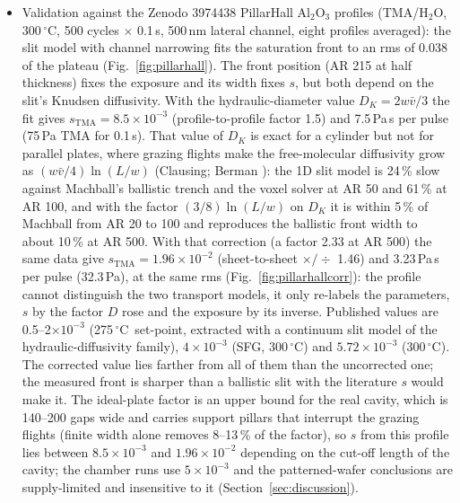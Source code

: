 \documentclass[11pt,letterpaper]{article}
\newcommand{\degC}{$^{\circ}$C}
\begin{document}
\begin{itemize}
\item Validation against the Zenodo 3974438 PillarHall Al$_2$O$_3$ profiles \cite{zenodo3974438,yim2020} (TMA/H$_2$O, 300\,\degC, 500 cycles $\times$ 0.1\,s, 500\,nm lateral channel, eight profiles averaged): the slit model with channel narrowing fits the saturation front to an rms of 0.038 of the plateau (Fig.~\ref{fig:pillarhall}). The front position (AR 215 at half thickness) fixes the exposure and its width fixes $s$, but both depend on the slit's Knudsen diffusivity. With the hydraulic-diameter value $D_K = 2w\bar{v}/3$ the fit gives $s_{\mathrm{TMA}} = 8.5\times10^{-3}$ (profile-to-profile factor 1.5) and 7.5\,Pa\,s per pulse (75\,Pa TMA for 0.1\,s). That value of $D_K$ is exact for a cylinder but not for parallel plates, where grazing flights make the free-molecular diffusivity grow as $(w\bar{v}/4)\ln(L/w)$ (Clausing; Berman \cite{berman1965}): the 1D slit model is 24\,\% slow against Machball's ballistic trench and the voxel solver at AR 50 and 61\,\% at AR 100, and with the factor $(3/8)\ln(L/w)$ on $D_K$ it is within 5\,\% of Machball from AR 20 to 100 and reproduces the ballistic front width to about 10\,\% at AR 500. With that correction (a factor 2.33 at AR 500) the same data give $s_{\mathrm{TMA}} = 1.96\times10^{-2}$ (sheet-to-sheet $\times/\div$ 1.46) and 3.23\,Pa\,s per pulse (32.3\,Pa), at the same rms (Fig.~\ref{fig:pillarhallcorr}): the profile cannot distinguish the two transport models, it only re-labels the parameters, $s$ by the factor $D$ rose and the exposure by its inverse. Published values are 0.5--2$\times10^{-3}$ \cite{arts2019jvsta} (275\,\degC\ set-point, extracted with a continuum slit model of the hydraulic-diffusivity family), $4\times10^{-3}$ \cite{vandalon2016} (SFG, 300\,\degC) and $5.72\times10^{-3}$ \cite{ylilammi2018} (300\,\degC). The corrected value lies farther from all of them than the uncorrected one; the measured front is sharper than a ballistic slit with the literature $s$ would make it. The ideal-plate factor is an upper bound for the real cavity, which is 140--200 gaps wide and carries support pillars that interrupt the grazing flights (finite width alone removes 8--13\,\% of the factor), so $s$ from this profile lies between $8.5\times10^{-3}$ and $1.96\times10^{-2}$ depending on the cut-off length of the cavity; the chamber runs use $5\times10^{-3}$ and the patterned-wafer conclusions are supply-limited and insensitive to it (Section~\ref{sec:discussion}).
\end{itemize}
\end{document}
